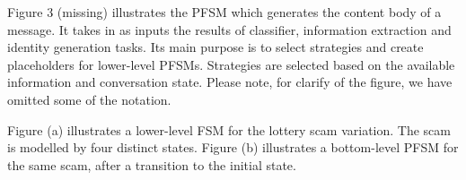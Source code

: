 Figure 3 (missing) illustrates the PFSM which generates the content body of a message. It takes in as inputs the results of classifier, information extraction and identity generation tasks. Its main purpose is to select strategies and create placeholders for lower-level PFSMs. Strategies are selected based on the available information and conversation state. Please note, for clarify of the figure, we have omitted some of the notation.

Figure (a) illustrates a lower-level FSM for the lottery scam variation. The scam is modelled by four distinct states. Figure (b) illustrates a bottom-level PFSM for the same scam, after a transition to the initial state.

\begin{figure}
  \centering
  ~ %

\end{figure}
